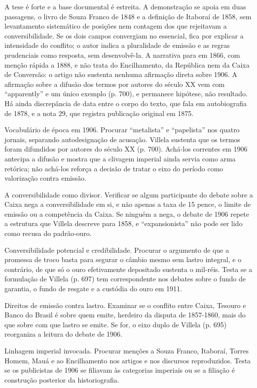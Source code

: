 A tese é forte e a base documental é estreita. A demonstração se apoia em duas
passagens, o livro de Souza Franco de 1848 e a definição de Itaboraí de 1858, sem
levantamento sistemático de posições nem contagem dos que rejeitavam a
conversibilidade. Se os dois campos convergiam no essencial, fica por explicar a
intensidade do conflito; o autor indica a pluralidade de emissão e as regras
prudenciais como resposta, sem desenvolvê-la. A narrativa para em 1866, com
menção rápida a 1888, e não trata do Encilhamento, da República nem da Caixa de
Conversão: o artigo não sustenta nenhuma afirmação direta sobre 1906. A
afirmação sobre a difusão dos termos por autores do século XX vem com
``apparently'' e um único exemplo (p. 700), e permanece hipótese, não resultado.
Há ainda discrepância de data entre o corpo do texto, que fala em autobiografia
de 1878, e a nota 29, que registra publicação original em 1875.

\begin{dialogo}
\item Vocabulário de época em 1906. Procurar ``metalista'' e ``papelista'' nos
quatro jornais, separando autodesignação de acusação. Villela sustenta que os
termos foram difundidos por autores do século XX (p. 700). Achá-los correntes em
1906 antecipa a difusão e mostra que a clivagem imperial ainda servia como arma
retórica; não achá-los reforça a decisão de tratar o eixo do período como
valorização contra emissão.

\item A conversibilidade como divisor. Verificar se algum participante do debate
sobre a Caixa nega a conversibilidade em si, e não apenas a taxa de 15 pence, o
limite de emissão ou a competência da Caixa. Se ninguém a nega, o debate de 1906
repete a estrutura que Villela descreve para 1858, e ``expansionista'' não pode
ser lido como recusa do padrão-ouro.

\item Conversibilidade potencial e credibilidade. Procurar o argumento de que a
promessa de troco basta para segurar o câmbio mesmo sem lastro integral, e o
contrário, de que só o ouro efetivamente depositado sustenta o mil-réis. Testa se
a formulação de Villela (p. 697) tem correspondente nos debates sobre o fundo de
garantia, o fundo de resgate e a custódia do ouro em 1911.

\item Direitos de emissão contra lastro. Examinar se o conflito entre Caixa,
Tesouro e Banco do Brasil é sobre quem emite, herdeiro da disputa de 1857-1860,
mais do que sobre com que lastro se emite. Se for, o eixo duplo de Villela
(p. 695) reorganiza a leitura do debate de 1906.

\item Linhagem imperial invocada. Procurar menções a Souza Franco, Itaboraí,
Torres Homem, Mauá e ao Encilhamento nos artigos e nos discursos reproduzidos.
Testa se os publicistas de 1906 se filiavam às categorias imperiais ou se a
filiação é construção posterior da historiografia.
\end{dialogo}

